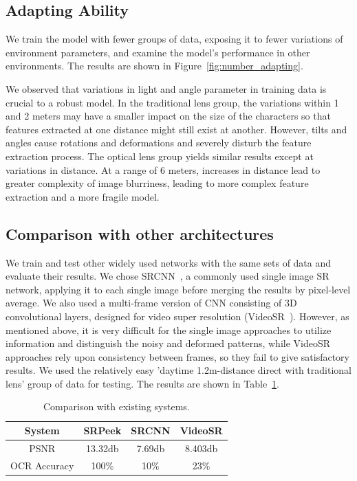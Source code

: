 \subsection{Adapting Ability}
We train the model with fewer groups of data, exposing it to fewer variations of environment parameters, and examine the model's performance in other environments. The results are shown in Figure~\ref{fig:number_adapting}.

We observed that variations in light and angle parameter in training data is crucial to a robust model. In the traditional lens group, the variations within 1 and 2 meters may have a smaller impact on the size of the characters
 so that features extracted at one distance might still exist at another.
 However, tilts and angles cause rotations and deformations and severely disturb the feature extraction process. The optical lens group yields similar results except at variations in distance. At a range of 6 meters, increases in distance lead to greater complexity of image blurriness, leading to more complex feature extraction and a more fragile model.

\subsection{Comparison with other architectures}
We train and test other widely used networks with the same sets of data and evaluate their results. We chose SRCNN~\cite{dong2015image}, a commonly used single image SR network, applying it to each single image before merging the results by pixel-level average. We also used a multi-frame version of CNN consisting of 3D convolutional layers, designed for video super resolution (VideoSR~\cite{kappeler2016video}). However, as mentioned above, it is very difficult for the single image approaches to utilize information and distinguish the noisy and deformed patterns, while VideoSR approaches rely upon consistency between frames, so they fail to give satisfactory results. We used the relatively easy 'daytime 1.2m-distance direct with traditional lens' group of data for testing. The results are shown in Table~\ref{table-comp}.
\begin{table}[!t]
    \centering
    \caption{Comparison with existing systems.}
    \begin{tabular}{@{}cccc@{}}
        \toprule
    System & SRPeek & SRCNN & VideoSR \\ \midrule
    PSNR & 13.32db & 7.69db & 8.403db\\ 
    OCR Accuracy & 100\% & 10\% & 23\%\\ \bottomrule
    \end{tabular}
    \label{table-comp}
\end{table}


